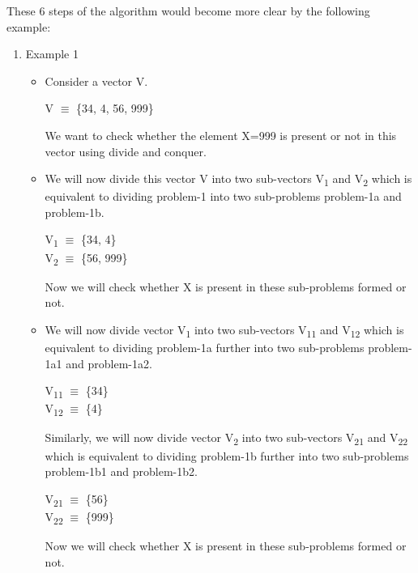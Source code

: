 \documentclass[conference]{IEEEtran}
\begin{document}
These 6 steps of the algorithm would become more clear by the following example:
\begin{enumerate}
    \item Example 1
    \begin{itemize}
    \item Consider a vector V.
    \begin{center}
        V $\equiv$ \{34, 4, 56, 999\}
    \end{center}
    We want to check whether the element X=999 is present or not in this vector using divide and conquer.
    \item We will now divide this vector V into two sub-vectors V\textsubscript{1} and V\textsubscript{2} which is equivalent to dividing problem-1 into two sub-problems problem-1a and problem-1b.
    \begin{center}
        V\textsubscript{1} $\equiv$ \{34, 4\}\\
        V\textsubscript{2} $\equiv$ \{56, 999\}
    \end{center}
    Now we will check whether X is present in these sub-problems formed or not.
    \item We will now divide vector V\textsubscript{1} into two sub-vectors V\textsubscript{11} and V\textsubscript{12} which is equivalent to dividing problem-1a further into two sub-problems problem-1a1 and problem-1a2.
    \begin{center}
        V\textsubscript{11} $\equiv$ \{34\}\\
        V\textsubscript{12} $\equiv$ \{4\}
    \end{center}
    Similarly, we will now divide vector V\textsubscript{2} into two sub-vectors V\textsubscript{21} and V\textsubscript{22} which is equivalent to dividing problem-1b further into two sub-problems problem-1b1 and problem-1b2.
    \begin{center}
        V\textsubscript{21} $\equiv$ \{56\}\\
        V\textsubscript{22} $\equiv$ \{999\}
    \end{center}
    Now we will check whether X is present in these sub-problems formed or not.
    \end{itemize}
\end{enumerate}
\end{document}
